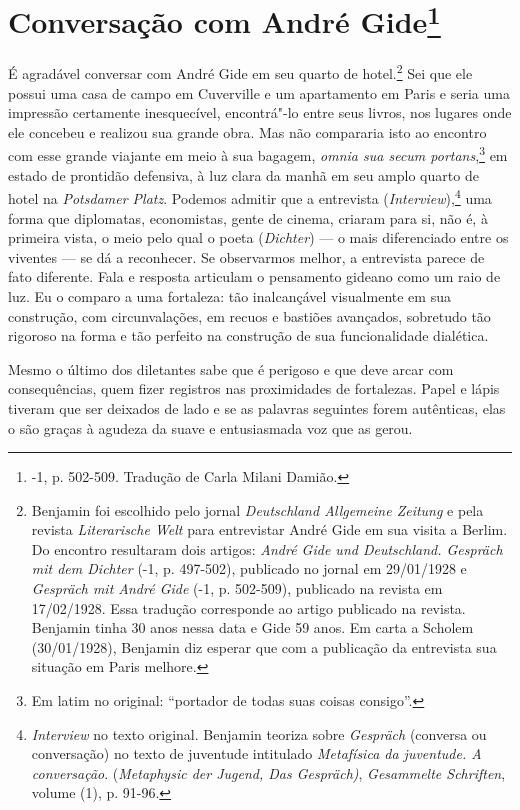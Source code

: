\chapter{Conversação com André Gide\footnote[*]{-1, p. 502-509. Tradução de
  Carla Milani Damião.}}

É agradável conversar com André Gide em seu quarto de hotel.\footnote{Benjamin
  foi escolhido pelo jornal \emph{Deutschland Allgemeine Zeitung} e pela
  revista \emph{Literarische Welt} para entrevistar André Gide em sua
  visita a Berlim. Do encontro resultaram dois artigos: \emph{André Gide
  und Deutschland. Gespräch mit dem Dichter} (-1, p. 497-502),
  publicado no jornal em 29/01/1928 e \emph{Gespräch mit André Gide}
  (-1, p. 502-509), publicado na revista em 17/02/1928. Essa
  tradução corresponde ao artigo publicado na revista. Benjamin tinha 30
  anos nessa data e Gide 59 anos. Em carta a Scholem (30/01/1928),
  Benjamin diz esperar que com a publicação da entrevista sua situação
  em Paris melhore. \versal{[N. T.]}} Sei que ele possui uma casa de campo em Cuverville e um
apartamento em Paris e seria uma impressão certamente inesquecível,
encontrá"-lo entre seus livros, nos lugares onde ele concebeu e realizou
sua grande obra. Mas não compararia isto ao encontro com esse grande
viajante em meio à sua bagagem, \emph{omnia sua secum portans},\footnote{Em latim no original: ``portador de todas suas coisas consigo''. \versal{[N. T.]}} em
estado de prontidão defensiva, à luz clara da manhã em seu amplo quarto
de hotel na \emph{Potsdamer Platz}. Podemos admitir que a entrevista
(\emph{Interview}),\footnote{\emph{Interview} no texto original.
  Benjamin teoriza sobre \emph{Gespräch} (conversa ou conversação) no
  texto de juventude intitulado \emph{Metafísica da juventude. A
  conversação}. (\emph{Metaphysic der Jugend, Das Gespräch)},
  \emph{Gesammelte Schriften}, volume (1), p. 91-96. \versal{[N. T.]}} uma forma que diplomatas, economistas, gente de cinema, criaram
para si, não é, à primeira vista, o meio pelo qual o poeta
(\emph{Dichter}) --- o mais diferenciado entre os viventes --- se dá a
reconhecer. Se observarmos melhor, a entrevista parece de fato
diferente. Fala e resposta articulam o pensamento gideano como um raio
de luz. Eu o comparo a uma fortaleza: tão inalcançável visualmente em
sua construção, com circunvalações, em recuos e bastiões avançados,
sobretudo tão rigoroso na forma e tão perfeito na construção de sua
funcionalidade dialética.

Mesmo o último dos diletantes sabe que é perigoso e que deve arcar com consequências,
quem fizer
registros nas proximidades de fortalezas. Papel e lápis tiveram que ser
deixados de lado e se as palavras seguintes forem autênticas, elas o são
graças à agudeza da suave e entusiasmada voz que as gerou.

